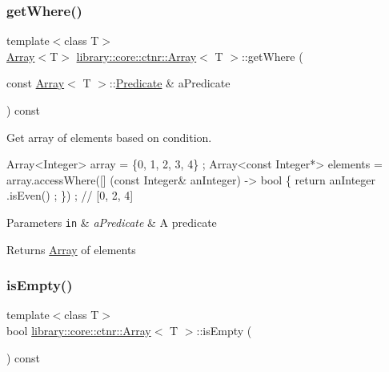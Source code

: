\subsubsection{\texorpdfstring{get\+Where()}{getWhere()}}
{\footnotesize\ttfamily template$<$class T$>$ \\
\hyperlink{classlibrary_1_1core_1_1ctnr_1_1Array}{Array}$<$T$>$ \hyperlink{classlibrary_1_1core_1_1ctnr_1_1Array}{library\+::core\+::ctnr\+::\+Array}$<$ T $>$\+::get\+Where (\begin{DoxyParamCaption}\item[{const \hyperlink{classlibrary_1_1core_1_1ctnr_1_1Array}{Array}$<$ T $>$\+::\hyperlink{classlibrary_1_1core_1_1ctnr_1_1Array_a74cd325a740870aea490b6b739aa06ae}{Predicate} \&}]{a\+Predicate }\end{DoxyParamCaption}) const}



Get array of elements based on condition. 


\begin{DoxyCode}
Array<Integer> array = \{0, 1, 2, 3, 4\} ;
Array<const Integer*> elements = array.accessWhere([] (\textcolor{keyword}{const} Integer& anInteger) -> \textcolor{keywordtype}{bool} \{ \textcolor{keywordflow}{return} anInteger
      .isEven() ; \}) ; \textcolor{comment}{// [0, 2, 4]}
\end{DoxyCode}



\begin{DoxyParams}[1]{Parameters}
\mbox{\tt in}  & {\em a\+Predicate} & A predicate \\
\hline
\end{DoxyParams}
\begin{DoxyReturn}{Returns}
\hyperlink{classlibrary_1_1core_1_1ctnr_1_1Array}{Array} of elements 
\end{DoxyReturn}
\mbox{\label{classlibrary_1_1core_1_1ctnr_1_1Array_a77d943be46a6d0313be3f2c5ca66d231}} 
\subsubsection{\texorpdfstring{is\+Empty()}{isEmpty()}}
{\footnotesize\ttfamily template$<$class T$>$ \\
bool \hyperlink{classlibrary_1_1core_1_1ctnr_1_1Array}{library\+::core\+::ctnr\+::\+Array}$<$ T $>$\+::is\+Empty (\begin{DoxyParamCaption}{ }\end{DoxyParamCaption}) const}



